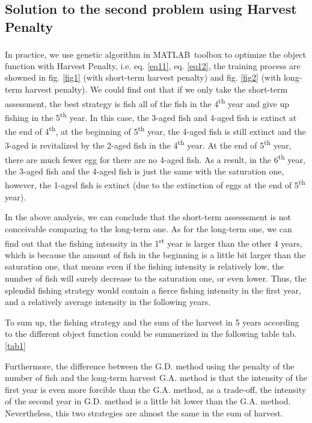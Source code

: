 \documentclass{IEEEtran}
\begin{document}
\subsection{Solution to the second problem using Harvest Penalty}

In practice, we use genetic algorithm in MATLAB\textsuperscript\textregistered \ toolbox to optimize the object function with Harvest Penalty, i.e. eq. \ref{eq11}, eq. \ref{eq12}, the training process are showned in fig. \ref{fig1} (with short-term harvest penalty) and fig. \ref{fig2} (with long-term harvest penalty). We could find out that if we only take the short-term assessment, the best strategy is fish all of the fish in the 4\textsuperscript{th} year and give up fishing in the 5\textsuperscript{th} year. In this case, the 3-aged fish and 4-aged fish is extinct at the end of 4\textsuperscript{th}, at the beginning of 5\textsuperscript{th} year, the 4-aged fish is still extinct and the 3-aged is revitalized by the 2-aged fish in the 4\textsuperscript{th} year. At the end of 5\textsuperscript{th} year, there are much fewer egg for there are no 4-aged fish. As a result, in the 6\textsuperscript{th} year, the 3-aged fish and the 4-aged fish is just the same with the saturation one, however, the 1-aged fish is extinct (due to the extinction of eggs at the end of 5\textsuperscript{th} year). 

In the above analysis, we can conclude that the short-term assesssment is not conceivable comparing to the long-term one. As for the long-term one, we can find out that the fishing intensity in the 1\textsuperscript{st} year is larger than the other 4 years, which is because the amount of fish in the beginning is a little bit larger than the saturation one, that means even if the fishing intensity is relatively low, the number of fish will surely decrease to the saturation one, or even lower. Thus, the splendid fishing strategy would contain a fierce fishing intensity in the first year, and a relatively average intensity in the following years. 

To sum up, the fishing strategy and the sum of the harvest in 5 years according to the different object function could be summerized in the following table tab. \ref{tab1}

Furthermore, the difference between the G.D. method using the penalty of the number of fish and the long-term harvest G.A. method is that the intensity of the first year is even more forcible than the G.A. method, as a trade-off, the intensity of the second year in G.D. method is a little bit lower than the G.A. method. Nevertheless, this two strategies are almost the same in the sum of harvest. 
\end{document}
